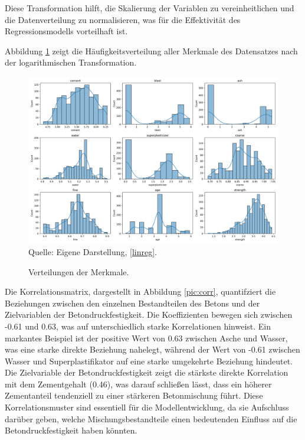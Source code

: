Diese Transformation hilft, die Skalierung der Variablen zu vereinheitlichen 
und die Datenverteilung zu normalisieren, was für die Effektivität des Regressionsmodells vorteilhaft ist.

Abbildung \ref{pic:hist} zeigt die Häufigkeitsverteilung aller Merkmale des Datensatzes nach der logarithmischen Transformation. 

\begin{figure}[!h]
    \caption{Verteilungen der Merkmale.}
    \includegraphics[width=1\textwidth]{../scripts/images/dist.png}
    Quelle: Eigene Darstellung, \ref{linreg}.
    \label{pic:hist}
\end{figure}

Die Korrelationsmatrix, dargestellt in Abbildung \ref{pic:corr}, 
quantifziert die Beziehungen zwischen den einzelnen Bestandteilen des Betons und der Zielvariablen der 
Betondruckfestigkeit. Die Koeffizienten bewegen sich zwischen -0.61 und 0.63, was auf 
unterschiedlich starke Korrelationen hinweist. Ein markantes Beispiel ist der positive Wert 
von 0.63 zwischen Asche und Wasser, was eine starke direkte Beziehung nahelegt, während der Wert 
von -0.61 zwischen Wasser und Superplastifikator auf eine starke umgekehrte Beziehung hindeutet. 
Die Zielvariable der Betondruckfestigkeit zeigt die stärkste direkte Korrelation mit dem Zementgehalt (0.46), 
was darauf schließen lässt, dass ein höherer Zementanteil tendenziell zu einer stärkeren Betonmischung führt. 
Diese Korrelationsmuster sind essentiell für die Modellentwicklung, da sie Aufschluss darüber geben, welche 
Mischungsbestandteile einen bedeutenden Einfluss auf die Betondruckfestigkeit haben könnten.

